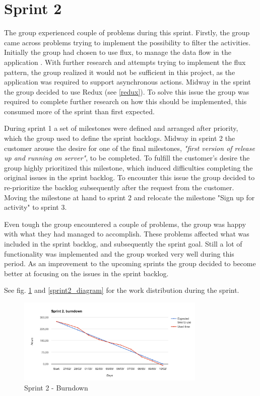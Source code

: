 \section{Sprint 2}
\label{Sprints-sprint2}
The group experienced couple of problems during this sprint. Firstly, the group came across problems trying to implement the possibility to filter the activities. Initially the group had chosen to use flux, to manage the data flow in the application \cite{flux}. With further research and attempts trying to implement the flux pattern, the group realized it would not be sufficient in this project, as the application was required to support asynchronous actions. Midway in the sprint the group decided to use Redux (see \ref{redux}). To solve this issue the group was required to complete further research on how this should be implemented, this consumed more of the sprint than first expected.

During sprint 1 a set of milestones were defined and arranged after priority, which the group used to define the sprint backlogs. Midway in sprint 2 the customer arouse the desire for one of the final milestones, \textit{"first version of release up and running on server"}, to be completed. To fulfill the customer's desire the group highly prioritized this milestone, which induced difficulties completing the original issues in the sprint backlog. To encounter this issue the group decided to re-prioritize the backlog subsequently after the request from the customer. Moving the milestone at hand to sprint 2 and relocate the milestone "Sign up for activity" to sprint 3. 

Even tough the group encountered a couple of problems, the group was happy with what they had managed to accomplish. These problems affected what was included in the sprint backlog, and subsequently the sprint goal. Still a lot of functionality was implemented and the group worked very well during this period. As an improvement to the upcoming sprints the group decided to become better at focusing on the issues in the sprint backlog.

See fig. \ref{sprint2_burndown} and \ref{sprint2_diagram} for the work distribution during the sprint.

\begin{figure}[ht]
\centering
    \includegraphics[width=0.8\textwidth]{fig/sprint2}
\caption{Sprint 2 - Burndown}
\label{sprint2_burndown}
\end{figure}

